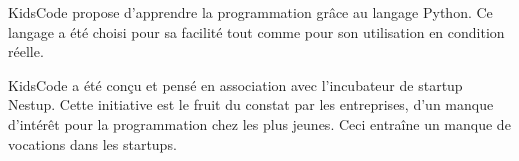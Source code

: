 KidsCode propose d'apprendre la programmation grâce au langage Python. Ce langage a été choisi pour sa facilité tout comme pour son utilisation en condition réelle.

KidsCode a été conçu et pensé en association avec l'incubateur de startup Nestup. Cette initiative est le fruit du constat par les entreprises, d'un manque d'intérêt pour la programmation chez les plus jeunes. Ceci entraîne un manque de vocations dans les startups.
